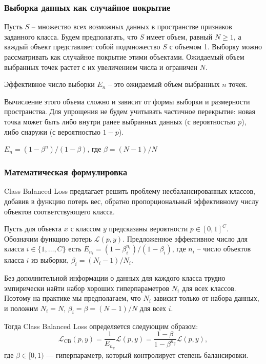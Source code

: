 \subsubsection*{Выборка данных как случайное покрытие}

Пусть $S$ -- множество всех возможных данных в пространстве признаков заданного класса. Будем предполагать, что
$S$ имеет объем, равный $N\ge1$, а каждый объект представляет собой подмножество $S$ с объемом 1. Выборку можно рассматривать как случайное покрытие этими объектами. Ожидаемый объем выбранных точек растет с их увеличением числа и ограничен $N$.

\begin{definition}
    Эффективное число выборки $E_n$ -- это ожидаемый объем выбранных $n$ точек.
\end{definition}

Вычисление этого объема сложно и зависит от формы выборки и размерности пространства. Для упрощения не будем учитывать частичное перекрытие: новая точка может быть либо внутри ранее выбранных данных (с вероятностью $p$), либо снаружи (с вероятностью $1-p$).

\begin{proposition}
    $E_n=(1-\beta^n)/(1-\beta)$, где $\beta=(N-1)/N$
\end{proposition}

\subsubsection*{Математическая формулировка}

Class Balanced Loss предлагает решить проблему несбалансированных классов, добавив в функцию потерь вес, обратно пропорциональный эффективному числу объектов соответствующего класса.

Пусть для объекта $x$ с классом $y$ предсказаны вероятности $p\in[0,1]^C$. Обозначим функцию потерь $\mathcal{L}(p,y)$. Предложенное эффективное число для класса $i\in\{1,\ldots,C\}$ есть $E_{n_i}=(1-\beta_i^{n_i})/(1-\beta_i)$, где $n_i$ -- число объектов класса $i$ из выборки, $\beta_i=(N_i-1)/N_i$.

Без дополнительной информации о данных для каждого класса трудно эмпирически найти набор хороших гиперпараметров $N_i$ для всех классов. Поэтому на практике мы предполагаем, что $N_i$ зависит только от набора данных, и положим $N_i = N$, $\beta_i = \beta = (N - 1)/N$ для всех $i$.

Тогда Class Balanced Loss определяется следующим образом:
\[
    \mathcal{L}_\text{CB}(p,y) = \dfrac{1}{E_{n_y}}\mathcal{L}(p,y) = \dfrac{1-\beta}{1-\beta^{n_y}}\mathcal{L}(p,y),
\]
где $\beta \in [0,1)$ — гиперпараметр, который контролирует степень балансировки.

